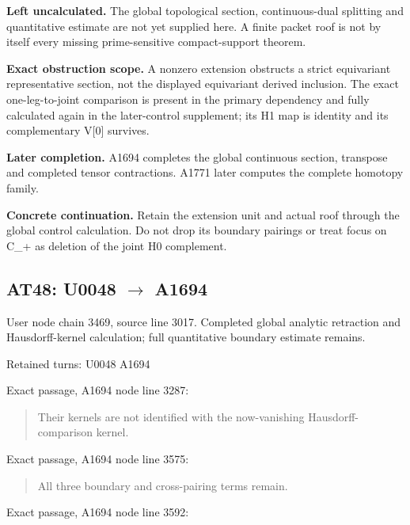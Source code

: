 \documentclass[10pt,a4paper,oneside]{report}
\begin{document}
\textbf{Left uncalculated.} The global topological section,
continuous-dual splitting and quantitative estimate are not yet supplied
here. A finite packet roof is not by itself every missing
prime-sensitive compact-support theorem.

\textbf{Exact obstruction scope.} A nonzero extension obstructs a strict
equivariant representative section, not the displayed equivariant
derived inclusion. The exact one-leg-to-joint comparison is present in
the primary dependency and fully calculated again in the later-control
supplement; its H1 map is identity and its complementary V{[}0{]}
survives.

\textbf{Later completion.} A1694 completes the global continuous
section, transpose and completed tensor contractions. A1771 later
computes the complete homotopy family.

\textbf{Concrete continuation.} Retain the extension unit and actual
roof through the global control calculation. Do not drop its boundary
pairings or treat focus on C\_+ as deletion of the joint H0 complement.

\subsection{\texorpdfstring{AT48: U0048
\allowbreak{}\ensuremath{→}\allowbreak{}
A1694}{AT48: U0048  A1694}}\label{at48-u0048-a1694}

User node \protect{} chain
3469, source line 3017. Completed global analytic retraction and
Hausdorff-kernel calculation; full quantitative boundary estimate
remains.

Retained turns: U0048
\protect{} A1694
\protect{}

Exact passage, A1694 node
\protect{} line 3287:

\begin{quote}
Their kernels are not identified with the now-vanishing
Hausdorff-comparison kernel.
\end{quote}

Exact passage, A1694 node
\protect{} line 3575:

\begin{quote}
All three boundary and cross-pairing terms remain.
\end{quote}

Exact passage, A1694 node
\protect{} line 3592:
\end{document}
